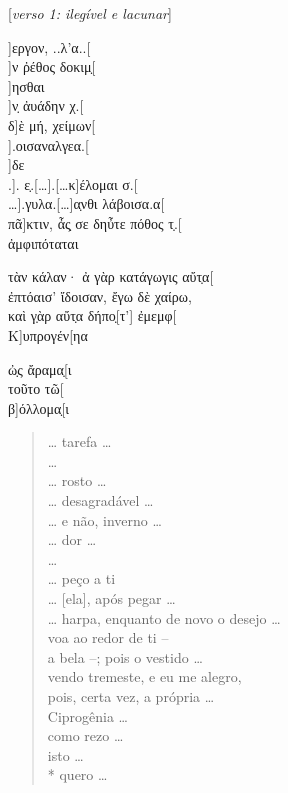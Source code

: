 \begin{gkverse}

\textnormal{[\textit{verso 1: ilegível e lacunar}]}

]εργον, ..λ’α..[\\
  ]ν ῤέθος δοκιμ̣[\\
    ]ησθαι\\
]ν̣ ἀυάδην χ.[\\
δ]ὲ μή, χείμων[\\
  ].οισαναλγεα.[\\
  ]δε\\
.]. ε̣.[\ldots{}].[\ldots{}κ]έλομαι σ.[\\
\ldots{}].γυλα.[\ldots{}]α̣νθι λάβοισα.α[\\
πᾶ]κτιν, ἆς̣ σε δηὖτε πόθος τ̣.[\\
ἀμφιπόταται

τὰν κάλαν· ἀ γὰρ κατάγωγις αὔτ̣α[\\
ἐπτόαισ’ ἴδοισαν, ἔγω δὲ χαίρω,\\
καὶ γ̣ὰρ αὔτ̣α δήπο̣[τ’] ἐμεμφ[\\
Κ]υπρογέν[ηα

ὠ̣ς ἄραμα̣[ι\\
τοῦτο τῶ[\\
β]όλλομα̣[ι

\end{gkverse}


\begin{verse}
\ldots{} tarefa \ldots{}\\
\ldots{}\\ 
\ldots{}  rosto \ldots{}\\  
\ldots{}  desagradável \ldots{}\\
\ldots{}  e não, inverno \ldots{}\\
\ldots{}  dor \ldots{}\\
\ldots{}\\ 
\ldots{}  peço a ti\\
\ldots{}  [ela], após pegar \ldots{}\\
\ldots{} harpa, enquanto de novo o desejo \ldots{}\\
voa ao redor de ti --\\
a bela --; pois o vestido \ldots{}\\
vendo tremeste, e eu me alegro,\\
pois, certa vez, a própria \ldots{} \\
Ciprogênia \ldots{}\\
como rezo \ldots{}\\
isto \ldots{}\\*
quero \ldots{}\\
\end{verse}

